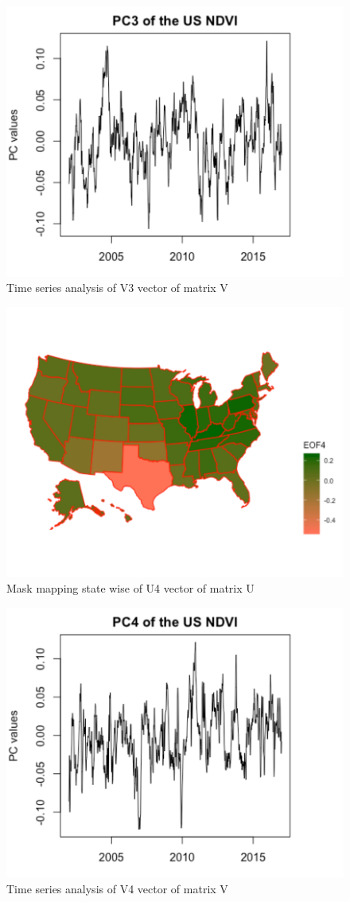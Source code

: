      \begin{figure}[H]
            \centering
            \includegraphics[width=0.70\linewidth]{figures/ch5/SVD/pc3.png}
            \caption{\label{fig:V_3} Time series analysis of V3 vector of matrix V}
    \end{figure}
    
    
     \begin{figure}[H]
            \centering
            \includegraphics[width=0.70\linewidth]{figures/ch5/SVD/eof4.png}
            \caption{\label{fig:EOF_4} Mask mapping state wise of U4 vector of matrix U}
    \end{figure}
    
     \begin{figure}[H]
            \centering
            \includegraphics[width=0.70\linewidth]{figures/ch5/SVD/pc4.png}
            \caption{\label{fig:V_4} Time series analysis of V4 vector of matrix V}
    \end{figure}
    

